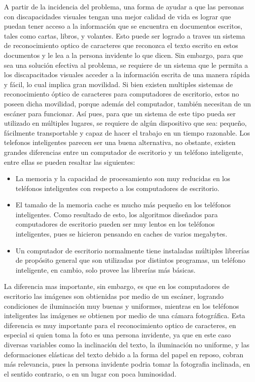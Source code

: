 \documentclass[a4paper, 11pt, oneside]{article}
\begin{document}
	A partir de la incidencia del problema, una forma de ayudar a que las personas con discapacidades visuales tengan una mejor calidad de vida es lograr que puedan tener acceso a la información que se encuentra en documentos escritos, tales como cartas, libros, y volantes. Esto puede ser logrado a traves un sistema de reconocimiento optico de caracteres que reconozca el texto escrito en estos documentos y le lea a la persona invidente lo que dicen. Sin embargo, para que sea una solución efectiva al problema, se requiere de un sistema que le permita a los discapacitados visuales acceder a la información escrita de una manera rápida y fácil, lo cual implica gran movilidad. Si bien existen multiples sistemas de reconocimiento óptico de caracteres para computadores de escritorio, estos no poseen dicha movilidad, porque además del computador, también necesitan de un escáner para funcionar. Así pues, para que un sistema de este tipo pueda ser utilizado en múltiples lugares, se requiere de algún dispositivo que sea: pequeño, fácilmente transportable y capaz de hacer el trabajo en un tiempo razonable. Los telefonos inteligentes parecen ser una buena alternativa, no obstante, existen grandes diferencias entre un computador de escritorio y un teléfono inteligente, entre ellas se pueden resaltar las siguientes:
	
	\begin{itemize}
	
	\item La memoria y la capacidad de procesamiento son muy reducidas en los teléfonos inteligentes con respecto a los computadores de escritorio.

	\item El tamaño de la memoria cache es mucho más pequeño en los teléfonos inteligentes. Como resultado de esto, los algoritmos diseñados para computadores de escritorio pueden ser muy lentos en los teléfonos inteligentes, pues se hicieron pensando en caches de varios megabytes.

	\item Un computador de escritorio normalmente tiene instaladas múltiples librerías de propósito general que son utilizadas por distintos programas, un teléfono inteligente, en cambio, solo provee las librerías más básicas.

	\end{itemize}

	La diferencia mas importante, sin embargo, es que en los computadores de escritorio las imágenes son obtienidas por medio de un escáner, logrando condiciones de iluminación muy buenas y uniformes, mientras en los teléfonos inteligentes las imágenes se obtienen por medio de una cámara fotográfica. Esta diferencia es muy importante para el reconocimiento optico de caracteres, en especial si quien toma la foto es una persona invidente, ya que en este caso diversas variables como la inclinación del texto, la iluminación no uniforme, y las deformaciones elásticas del texto debido a la forma del papel en reposo, cobran más relevancia, pues la persona invidente podria tomar la fotografia inclinada, en el sentido contrario, o en un lugar con poca luminosidad.
\end{document}
